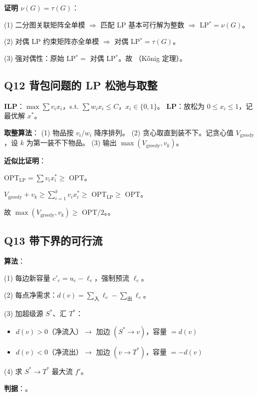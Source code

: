 \documentclass[11pt,a4paper]{ctexart}
\begin{document}
\textbf{证明 $\nu(G) = \tau(G)$}：

(1) 二分图关联矩阵全单模 $\Rightarrow$ 匹配 LP 基本可行解为整数 $\Rightarrow$ LP$^* = \nu(G)$。

(2) 对偶 LP 约束矩阵亦全单模 $\Rightarrow$ 对偶 LP$^* = \tau(G)$。

(3) 强对偶性：原始 LP$^* =$ 对偶 LP$^*$。故 （K\H{o}nig 定理）。


\subsection*{Q12 \quad 背包问题的 LP 松弛与取整}

\textbf{ILP}：$\max\sum v_i x_i$，s.t. $\sum w_i x_i \leq C$，$x_i\in\{0,1\}$。
\textbf{LP}：放松为 $0\leq x_i\leq 1$，记最优解 $x^*$。

\textbf{取整算法}：
(1) 物品按 $v_i/w_i$ 降序排列。
(2) 贪心取直到装不下。记贪心值 $V_{\text{greedy}}$，设 $k$ 为第一装不下物品。
(3) 输出 $\max(V_{\text{greedy}}, v_k)$。

\textbf{近似比证明}：

OPT$_{\text{LP}} = \sum v_i x^*_i \geq$ OPT。

$V_{\text{greedy}} + v_k \geq \sum_{i=1}^k v_i x^*_i \geq$ OPT$_{\text{LP}} \geq$ OPT。

故 $\max(V_{\text{greedy}}, v_k) \geq$ OPT$/2$。。


\subsection*{Q13 \quad 带下界的可行流}

\textbf{算法}：

(1) 每边新容量 $c'_e = u_e - \ell_e$，强制预流 $\ell_e$。

(2) 每点净需求：$d(v) = \sum_{\text{入}} \ell_e - \sum_{\text{出}} \ell_e$。

(3) 加超级源 $S^*$、汇 $T^*$：
\begin{itemize}
\item $d(v) > 0$（净流入）$\to$ 加边 $(S^* \to v)$，容量 $= d(v)$
\item $d(v) < 0$（净流出）$\to$ 加边 $(v \to T^*)$，容量 $= -d(v)$
\end{itemize}

(4) 求 $S^*\to T^*$ 最大流 $f'$。

\textbf{判据}：。
\end{document}
